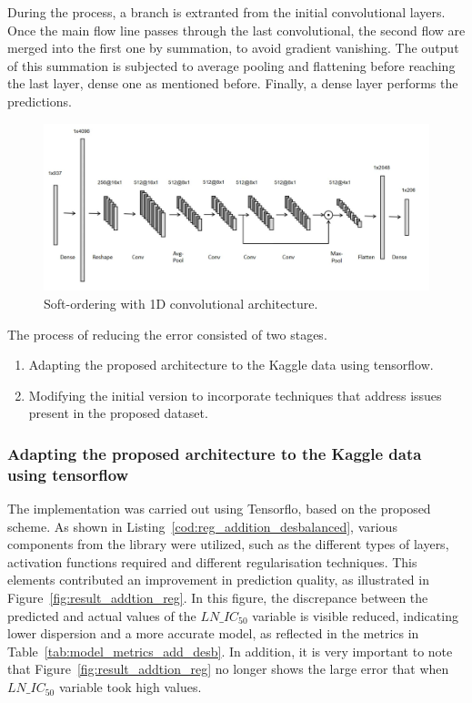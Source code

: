 During the process, a branch is extranted from the initial convolutional layers. Once the main flow line passes through the last convolutional, the second flow are merged into the first one by summation, to avoid gradient vanishing. The output of this summation is subjected to average pooling and flattening before reaching the last layer, dense one as mentioned before. Finally, a dense layer performs the predictions. 

\begin{figure}[H]
    \centering
    \includegraphics[width=1\textwidth]{figures/softOrdering1D.png}
    \caption{Soft-ordering with 1D convolutional architecture.}
    \label{fig:softOrdering1D}
\end{figure}

The process of reducing the error consisted of two stages. 

\begin{enumerate}
    \item Adapting the proposed architecture to the Kaggle data using tensorflow.
    \item Modifying the initial version to incorporate techniques that address issues present in the proposed dataset.
\end{enumerate}

\subsubsection{Adapting the proposed architecture to the Kaggle data using tensorflow}

The implementation was carried out using Tensorflo, based on the proposed scheme. As shown in Listing~\ref{cod:reg_addition_desbalanced}, various components from the library were utilized, such as the different types of layers, activation functions required and different regularisation techniques. This elements contributed an improvement in prediction quality, as illustrated in Figure~\ref{fig:result_addtion_reg}. In this figure, the discrepance between the predicted and actual values of the \(LN\_IC_{50}\) variable is visible reduced, indicating lower dispersion and a more accurate model, as reflected in the metrics in Table~\ref{tab:model_metrics_add_desb}. In addition, it is very important to note that Figure~\ref{fig:result_addtion_reg} no longer shows the large error that when \(LN\_IC_{50}\) variable took high values.

